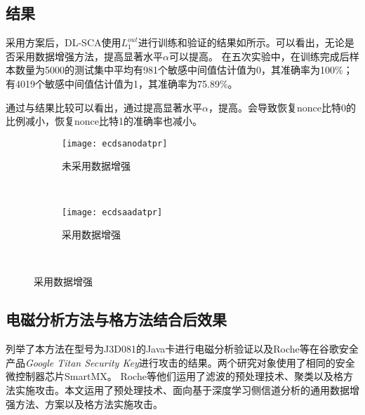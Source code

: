 {{	\subsection{\jiashejianyanguji 结果}
	采用\jiashejianyanguji 方案后，DL-SCA使用$L_1^{out}$进行训练和验证的结果如所示。可以看出，无论是否采用数据增强方法，提高显著水平$\alpha$可以提高\zyx 。%
	在五次实验中，在训练完成后样本数量为5000的测试集中平均有981个敏感中间值估计值为0，其准确率为100\%；有4019个敏感中间值估计值为1，其准确率为75.89\%。

	通过与\shujuzengqiang 结果比较可以看出，\jiashejianyanguji 通过提高显著水平$\alpha$，提高\zyx。\jiashejianyanguji 会导致恢复nonce比特0的比例减小，恢复nonce比特1的准确率也减小。
	
	\begin{figure}[!h]
		\centering
		\begin{subfigure}[b]{\twof\textwidth}
			\texttt{[image: ecdsanodatpr]}
			\caption{未采用数据增强}
			\label{fig:ecdsanodatpr}
		\end{subfigure}%
		~%
		\begin{subfigure}[b]{\twof\textwidth}
			\texttt{[image: ecdsaadatpr]}
			\caption{采用数据增强}
			\label{fig:ecdsaadatpr}
		\end{subfigure}
		\\
		\label{fig:ecdsatpr}
	\end{figure}
	
	
	\subsection{电磁分析方法与格方法结合后效果}
	{\color{\xchange}
	
	列举了本方法在型号为J3D081的Java卡进行电磁分析验证以及Roche等\citep{Roche21}在谷歌安全产品\textit{Google Titan Security Key}\citep{Titan}进行攻击的结果。两个研究对象使用了相同的安全微控制器芯片SmartMX\citep{p5x}。%
	Roche等\citep{Roche21}他们运用了滤波的预处理技术、聚类以及格方法实施攻击。本文运用了\yuchuli 预处理技术、面向基于深度学习侧信道分析的通用数据增强方法、\jiashejianyanguji 方案以及格方法实施攻击。
	
}}}
